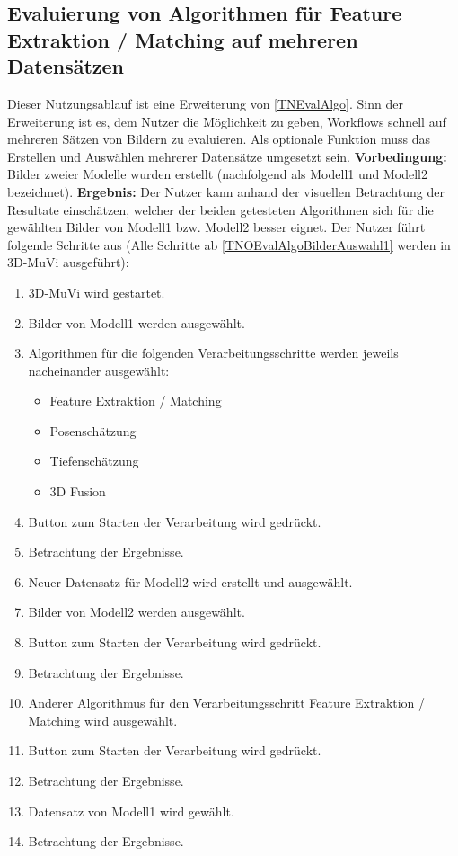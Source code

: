 \subsection{Evaluierung von Algorithmen für Feature Extraktion / Matching auf mehreren Datensätzen}
Dieser Nutzungsablauf ist eine Erweiterung von \ref{TNEvalAlgo}. Sinn der Erweiterung ist es, dem Nutzer die Möglichkeit zu geben, Workflows schnell auf mehreren Sätzen von Bildern zu evaluieren. Als optionale Funktion muss das Erstellen und Auswählen mehrerer Datensätze umgesetzt sein.\newline
\textbf{Vorbedingung:} Bilder zweier Modelle wurden erstellt (nachfolgend als Modell1 und Modell2 bezeichnet). \newline
\textbf{Ergebnis:} Der Nutzer kann anhand der visuellen Betrachtung der Resultate einschätzen, welcher der beiden getesteten Algorithmen sich für die gewählten Bilder von Modell1 bzw. Modell2 besser eignet. \newline
Der Nutzer führt folgende Schritte aus (Alle Schritte ab \ref{TNOEvalAlgoBilderAuswahl1} werden in 3D-MuVi ausgeführt):
\begin{enumerate}
	\item 3D-MuVi wird gestartet.
	\item \label{TNOEvalAlgoBilderAuswahl1} Bilder von Modell1 werden ausgewählt.
	\item Algorithmen für die folgenden Verarbeitungsschritte werden jeweils nacheinander ausgewählt:
	\begin{itemize}
		\item Feature Extraktion / Matching
		\item Posenschätzung
		\item Tiefenschätzung
		\item 3D Fusion
	\end{itemize}
	\item Button zum Starten der Verarbeitung wird gedrückt.
	\item Betrachtung der Ergebnisse.
	\item Neuer Datensatz für Modell2 wird erstellt und ausgewählt.
	\item Bilder von Modell2 werden ausgewählt.
	\item Button zum Starten der Verarbeitung wird gedrückt.
	\item Betrachtung der Ergebnisse.
	\item Anderer Algorithmus für den Verarbeitungsschritt Feature Extraktion / Matching wird ausgewählt.
	\item Button zum Starten der Verarbeitung wird gedrückt.
	\item Betrachtung der Ergebnisse.
	\item Datensatz von Modell1 wird gewählt.
	\item Betrachtung der Ergebnisse.
\end{enumerate}

